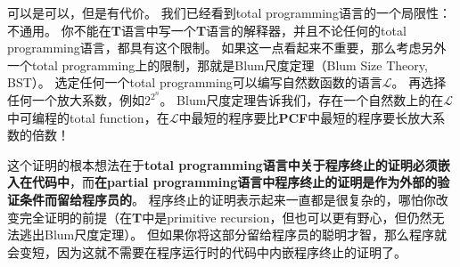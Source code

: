 可以是可以，但是有代价。
我们已经看到\gls{total programming}语言的一个局限性：不通用。
你不能在\textbf{T}语言中写一个\textbf{T}语言的解释器，并且不论任何的\gls{total programming}语言，都具有这个限制。
如果这一点看起来不重要，那么考虑另外一个\gls{total programming}上的限制，那就是Blum尺度定理（Blum Size Theory, BST）。
选定任何一个\gls{total programming}可以编写自然数函数的语言\(\mathcal{L}\)。
再选择任何一个放大系数，例如\(2^{2^n}\)。
Blum尺度定理告诉我们，存在一个自然数上的在\(\mathcal{L}\)中可编程的\gls{total function}，在\(\mathcal{L}\)中最短的程序要比\textbf{PCF}中最短的程序要长放大系数的倍数！

这个证明的根本想法在于\textbf{\gls{total programming}语言中关于程序终止的证明必须嵌入在代码中}，而\textbf{在\gls{partial programming}语言中程序终止的证明是作为外部的验证条件而留给程序员的}。
程序终止的证明表示起来一直都是很复杂的，哪怕你改变完全证明的前提（在\textbf{T}中是\gls{primitive recursion}，但也可以更有野心，但仍然无法逃出Blum尺度定理）。
但如果你将这部分留给程序员的聪明才智，那么程序就会变短，因为这就不需要在程序运行时的代码中内嵌程序终止的证明了。
